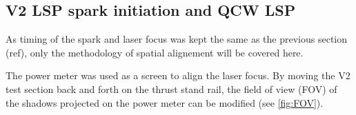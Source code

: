 

        \subsection{V2 LSP spark initiation and QCW LSP}


            As timing of the spark and laser focus was kept the same as the previous section (ref), only the methodology of spatial alignement will be covered here.


            The power meter was used as a screen to align the laser focus. By moving the V2 test section back and forth on the thrust stand rail, the field of view (FOV) of the shadows projected on the power meter can be modified (see \autoref{fig:FOV}). 
            
